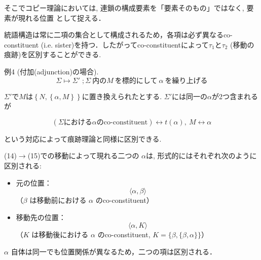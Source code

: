 \documentclass[dvipdfmx, xcolor={dvipsnames},12pt]{beamer}
\begin{document}
\begin{frame}

そこでコピー理論においては, 連鎖の構成要素を「要素そのもの」ではなく, 
\alert{要素が現れる位置} として捉える．

\medskip
統語構造は常に二項の集合として構成されるため，各項は必ず異なるco-constituent (i.e. sister)を持つ．したがってco-constituentによって$\tau_1$と$\tau_2$ (移動の痕跡)を区別することができる.


\begin{Ex}{例4 (付加(adjunction)の場合).}
\[
\Sigma \mapsto \Sigma'\; ; \Sigma\:\text{内の}M\:\text{を標的にして}\:\alpha\:\text{を繰り上げる}
\]

$\Sigma'$で$M$は$\left\{N, \left\{\alpha, M\right\}\right\}$に置き換えられたとする. $\Sigma'$には同一の$\alpha$が2つ含まれるが

\[
(\Sigma\text{における}\alpha\text{のco-constituent})
\leftrightarrow t(\alpha),\:M \leftrightarrow \alpha
\]

という対応によって痕跡理論と同様に区別できる.
\end{Ex}
\end{frame}


\begin{frame}

(14)$\to$(15)での移動によって現れる二つの $\alpha$は, 形式的にはそれぞれ次のように区別される$\colon$

\medskip
\begin{itemize}
\item 元の位置：
\[
\langle \alpha, \beta \rangle
\]
（$\beta$ は移動前における $\alpha$ のco-constituent）

\item 移動先の位置：
\[
\langle \alpha, K \rangle
\]
（$K$ は移動後における $\alpha$ のco-constituent, $K=\{\beta, \{\beta, \alpha\}\}$）
\end{itemize}

\vspace{1em}

$\alpha$ 自体は同一でも位置関係が異なるため，二つの項は区別される．

\end{frame}
\end{document}
